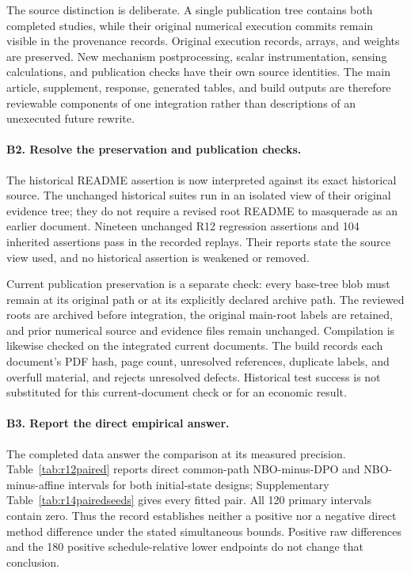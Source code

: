The source distinction is deliberate. A single publication tree contains both completed studies, while their original numerical execution commits remain visible in the provenance records. Original execution records, arrays, and weights are preserved. New mechanism postprocessing, scalar instrumentation, sensing calculations, and publication checks have their own source identities. The main article, supplement, response, generated tables, and build outputs are therefore reviewable components of one integration rather than descriptions of an unexecuted future rewrite.

\paragraph*{B2. Resolve the preservation and publication checks.}
The historical README assertion is now interpreted against its exact historical source. The unchanged historical suites run in an isolated view of their original evidence tree; they do not require a revised root README to masquerade as an earlier document. Nineteen unchanged R12 regression assertions and 104 inherited assertions pass in the recorded replays. Their reports state the source view used, and no historical assertion is weakened or removed.

Current publication preservation is a separate check: every base-tree blob must remain at its original path or at its explicitly declared archive path. The reviewed roots are archived before integration, the original main-root labels are retained, and prior numerical source and evidence files remain unchanged. Compilation is likewise checked on the integrated current documents. The build records each document's PDF hash, page count, unresolved references, duplicate labels, and overfull material, and rejects unresolved defects. Historical test success is not substituted for this current-document check or for an economic result.

\paragraph*{B3. Report the direct empirical answer.}
The completed data answer the comparison at its measured precision. Table~\ref{tab:r12paired} reports direct common-path NBO-minus-DPO and NBO-minus-affine intervals for both initial-state designs; Supplementary Table~\ref{tab:r14pairedseeds} gives every fitted pair. All 120 primary intervals contain zero. Thus the record establishes neither a positive nor a negative direct method difference under the stated simultaneous bounds. Positive raw differences and the 180 positive schedule-relative lower endpoints do not change that conclusion.

